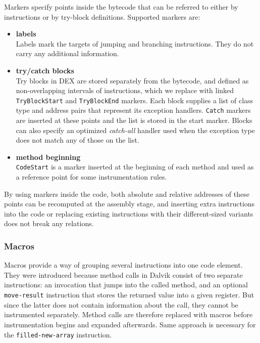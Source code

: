 \documentclass[12pt,twoside,notitlepage]{report}
\begin{document}
Markers specify points inside the bytecode that can be referred to either by instructions or by try-block definitions. Supported markers are:
\begin{itemize}
\item \textbf{labels} \\
Labels mark the targets of jumping and branching instructions. They do not carry any additional information.
\item \textbf{try/catch blocks} \\
Try blocks in DEX are stored separately from the bytecode, and defined as non-overlapping intervals of instructions, which we replace with linked \verb$TryBlockStart$ and \verb$TryBlockEnd$ markers. Each block supplies a list of class type and address pairs that represent its exception handlers. \verb$Catch$ markers are inserted at these points and the list is stored in the start marker. Blocks can also specify an optimized \emph{catch-all} handler used when the exception type does not match any of those on the list.
\item \textbf{method beginning} \\
\verb$CodeStart$ is a marker inserted at the beginning of each method and used as a reference point for some instrumentation rules.
\end{itemize}

By using markers inside the code, both absolute and relative addresses of these points can be recomputed at the assembly stage, and inserting extra instructions into the code or replacing existing instructions with their different-sized variants does not break any relations.

\subsubsection{Macros}
\label{section:Code_Macros}

Macros provide a way of grouping several instructions into one code element. They were introduced because method calls in Dalvik consist of two separate instructions: an invocation that jumps into the called method, and an optional \verb$move-result$ instruction that stores the returned value into a given register. But since the latter does not contain information about the call, they cannot be instrumented separately. Method calls are therefore replaced with macros before instrumentation begins and expanded afterwards. Same approach is necessary for the \verb$filled-new-array$ instruction.
\end{document}
